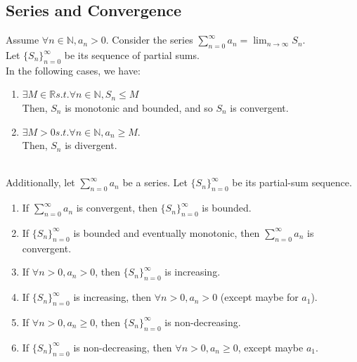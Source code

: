 \documentclass{article}
\begin{document}
\subsection{Series and Convergence}
Assume $\forall n \in \mathbb{N}, a_n > 0$. Consider the series $\sum_{n=0}^\infty a_n = \lim_{n\to\infty} S_n$.\\
Let $\{S_n\}_{n=0}^\infty$ be its sequence of partial sums.\\
In the following cases, we have:
\begin{enumerate}
    \item $\exists M \in \mathbb{R} s.t. \forall n \in \mathbb{N}, S_n \leq M$\\
    Then, $S_n$ is monotonic and bounded, and so $S_n$ is convergent.
    
    \item $\exists M > 0 s.t. \forall n \in \mathbb{N}, a_n \geq M$.\\
    Then, $S_n$ is divergent.
\end{enumerate}
\\
Additionally, let $\sum_{n=0}^\infty a_n$ be a series. Let $\{S_n\}_{n=0}^\infty$ be its partial-sum sequence.
\begin{enumerate}
    \item If $\sum_{n=0}^\infty a_n$ is convergent, then $\{S_n\}_{n=0}^\infty$ is bounded.
    
    \item If $\{S_n\}_{n=0}^\infty$ is bounded and eventually monotonic, then $\sum_{n=0}^\infty a_n$ is convergent.
    
    \item If $\forall n > 0, a_n > 0$, then $\{S_n\}_{n=0}^\infty$ is increasing.
    
    \item If $\{S_n\}_{n=0}^\infty$ is increasing, then $\forall n > 0, a_n > 0$ (except maybe for $a_1$).
    
    \item If $\forall n > 0, a_n \geq 0$, then $\{S_n\}_{n=0}^\infty$ is non-decreasing.
    
    \item If $\{S_n\}_{n=0}^\infty$ is non-decreasing, then $\forall n > 0, a_n \geq 0$, except maybe $a_1$.
\end{enumerate}
\end{document}
